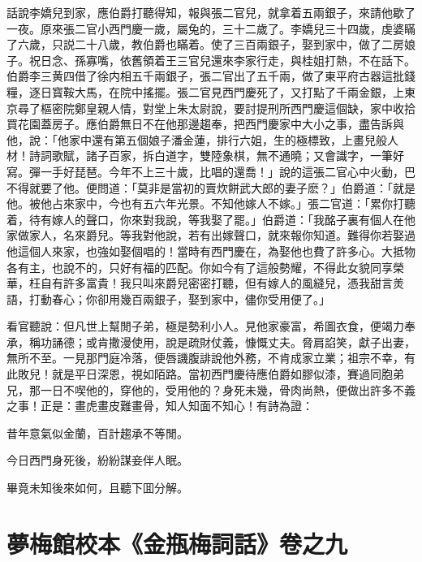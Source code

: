 話說李嬌兒到家，應伯爵打聽得知，報與張二官兒，就拿着五兩銀子，來請他歇了一夜。原來張二官小西門慶一歲，屬兔的，三十二歲了。李嬌兒三十四歲，虔婆瞞了六歲，只説二十八歲，教伯爵也瞞着。使了三百兩銀子，娶到家中，做了二房娘子。祝日念、孫寡嘴，依舊領着王三官兒還來李家行走，與桂姐打熱，不在話下。伯爵李三黄四借了徐内相五千兩銀子，張二官出了五千兩，做了東平府古器這批錢糧，逐日寳鞍大馬，在院中搖擺。張二官見西門慶死了，又打點了千兩金銀，上東京尋了樞密院鄭皇親人情，對堂上朱太尉說，要討提刑所西門慶這個缺，家中收拾買花園蓋房子。應伯爵無日不在他那邊趨奉，把西門慶家中大小之事，盡告訴與他，說：「他家中還有第五個娘子潘金蓮，排行六姐，生的極標致，上畫兒般人材！詩詞歌賦，諸子百家，拆白道字，雙陸象棋，無不通曉；又會識字，一筆好寫。彈一手好琵琶。今年不上三十歲，比唱的還喬！」說的這張二官心中火動，巴不得就要了他。便問道：「莫非是當初的賣炊餅武大郎的妻子麽？」伯爵道：「就是他。被他占來家中，今也有五六年光景。不知他嫁人不嫁。」張二官道：「累你打聽着，待有嫁人的聲口，你來對我說，等我娶了罷。」伯爵道：「我酩子裏有個人在他家做家人，名來爵兒。等我對他說，若有出嫁聲口，就來報你知道。難得你若娶過他這個人來家，也強如娶個唱的！當時有西門慶在，為娶他也費了許多心。大抵物各有主，也說不的，只好有福的匹配。你如今有了這般勢耀，不得此女貌同享榮華，枉自有許多富貴！我只叫來爵兒密密打聽，但有嫁人的風縫兒，憑我甜言羙語，打動春心；你卻用幾百兩銀子，娶到家中，儘你受用便了。」

看官聽說：但凡世上幫閒子弟，極是勢利小人。見他家豪富，希圖衣食，便竭力奉承，稱功誦德；或肯撒漫使用，說是疏財仗義，慷慨丈夫。脅肩諂笑，獻子出妻，無所不至。一見那門庭冷落，便唇譏腹誹說他外務，不肯成家立業；祖宗不幸，有此敗兒！就是平日深恩，視如陌路。當初西門慶待應伯爵如膠似漆，賽過同胞弟兄，那一日不喫他的，穿他的，受用他的？身死未幾，骨肉尚熱，便做出許多不義之事！正是：畫虎畫皮難畫骨，知人知面不知心！有詩為證：

\begin{myquote}
昔年意氣似金蘭，百計趨承不等閒。

今日西門身死後，紛紛謀妾伴人眠。
\end{myquote}

畢竟未知後來如何，且聽下囬分解。

\part*{夢梅館校本《金瓶梅詞話》卷之九}

